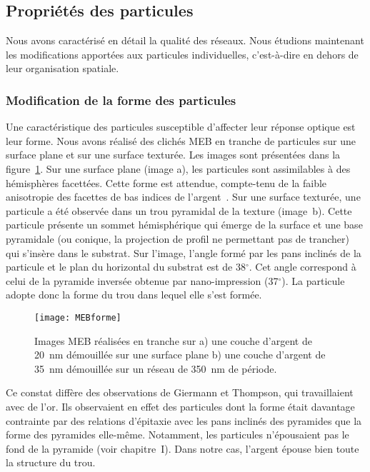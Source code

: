 	\subsection{Propriétés des particules}
Nous avons caractérisé en détail la qualité des réseaux. Nous étudions maintenant les modifications apportées aux particules individuelles, c'est-à-dire en dehors de leur organisation spatiale.\par 

\subsubsection{Modification de la forme des particules}
Une caractéristique des particules susceptible d'affecter leur réponse optique est leur forme. Nous avons réalisé des clichés MEB \og en tranche \fg{} de particules sur une surface plane et sur une surface texturée. Les images sont présentées dans la figure~\ref{MEBforme}. Sur une surface plane (image a), les particules sont assimilables à des hémisphères facettées. Cette forme est attendue, compte-tenu de la faible anisotropie des facettes de bas indices de l'argent~\cite{stankic2013equilibrium, winterbottom1967equilibrium}. Sur une surface texturée, une particule a été observée dans un trou pyramidal de la texture (image~b). Cette particule présente un sommet hémisphérique qui émerge de la surface et une base pyramidale (ou conique, la projection de profil ne permettant pas de trancher) qui s'insère dans le substrat. Sur l'image, l'angle formé par les pans inclinés de la particule et le plan du horizontal du substrat est de 38$^\circ$. Cet angle correspond à celui de la pyramide inversée obtenue par nano-impression (37$^\circ$). La particule adopte donc la forme du trou dans lequel elle s'est formée.\par
\begin{figure}[!htb]
\centering
\texttt{[image: MEBforme]}
\caption{Images MEB réalisées en tranche sur a) une couche d'argent de 20~nm démouillée sur une surface plane b) une couche d'argent de 35~nm démouillée sur un réseau de 350~nm de période.}
\label{MEBforme}
\end{figure}
Ce constat diffère des observations de Giermann et Thompson, qui travaillaient avec de l'or. Ils observaient en effet des particules dont la forme était davantage contrainte par des relations d'épitaxie avec les pans inclinés des pyramides que la forme des pyramides elle-même. Notamment, les particules n'épousaient pas le fond de la pyramide (voir chapitre~I). Dans notre cas, l'argent épouse bien toute la structure du trou.\par  

